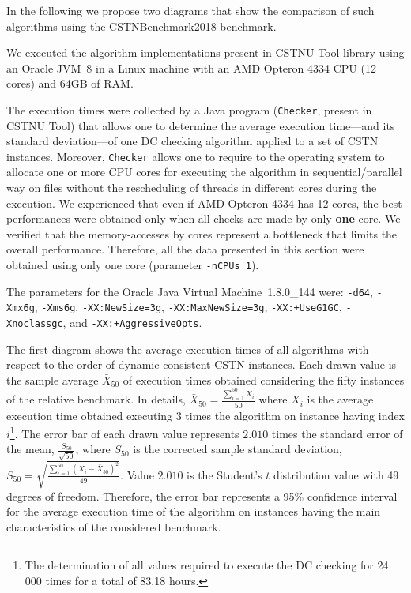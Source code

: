 \documentclass[a4paper,11pt]{article}
\begin{document}
In the following we propose two diagrams that show the comparison of such algorithms using the CSTNBenchmark2018 benchmark.

We executed the algorithm implementations present in CSTNU Tool library using an Oracle JVM~8 in a Linux machine with an AMD Opteron 4334 CPU (12 cores) and 64GB of RAM.

The execution times were collected by a Java program (\texttt{Checker}, present in CSTNU Tool) that allows one to determine the average execution time---and its standard deviation---of one DC checking algorithm applied to a set of CSTN instances. Moreover,  \texttt{Checker} allows one to require to the operating system to allocate one or more
CPU cores for executing the algorithm in sequential/parallel way on files without the rescheduling of threads in different cores during the execution.
We experienced that even if AMD Opteron 4334 has 12 cores, the best performances were obtained only when all checks are made by only \textbf{one} core.
We verified that the memory-accesses by cores represent a bottleneck that limits the overall performance.
Therefore, all the data presented in this section were obtained using only one core (parameter \texttt{-nCPUs 1}).

The parameters for the Oracle Java Virtual Machine~1.8.0\_144 were: \texttt{-d64}, \texttt{-Xmx6g}, \texttt{-Xms6g}, \texttt{-XX:NewSize=3g}, \texttt{-XX:MaxNewSize=3g}, \texttt{-XX:+UseG1GC}, \texttt{-Xnoclassgc}, and \texttt{-XX:+AggressiveOpts}.

The first diagram shows the average execution times of all algorithms with respect to the order of dynamic consistent CSTN instances.
Each drawn value is the sample average $\bar{X}_{50}$ of execution times obtained considering the fifty instances of the relative benchmark.
In details, $\bar{X}_{50}=\frac{\sum_{i=1}^{50} X_i}{50}$ where $X_i$ is the average execution time obtained executing 3 times the algorithm on instance having index $i$\footnote{The determination of all values required to execute the DC checking for 24 000 times for a total of 83.18 hours.}.
The error bar of each drawn value represents $2.010$ times the standard error of the mean, $\frac{S_{50}}{\sqrt{50}}$, where $S_{50}$ is the corrected sample standard deviation, $S_{50}= \sqrt{\frac{\sum_{i=1}^{50} (X_i-\bar{X}_{50})^2}{49}}$. Value $2.010$ is the Student's $t$ distribution value with 49 degrees of freedom.
Therefore, the error bar represents a 95\% confidence interval for the average execution time of the algorithm on instances having the main characteristics of the considered benchmark.
\end{document}
